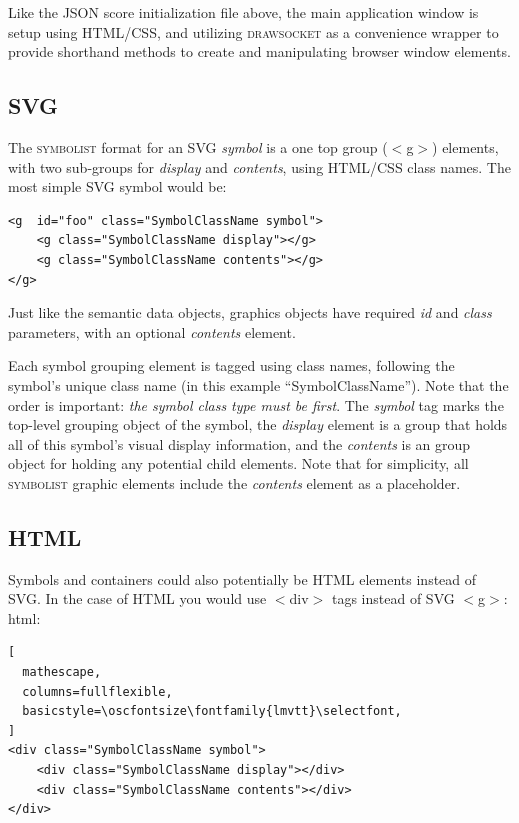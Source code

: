 \documentclass{article}
\def\symbolist{\textsc{symbolist}\xspace}
\def\drawsocket{\textsc{drawsocket}\xspace}
\def\oscfontsize{\footnotesize}
\begin{document}
Like the JSON score initialization file above, the main application window is setup using HTML/CSS, and utilizing \drawsocket as a convenience wrapper to provide shorthand methods to create and manipulating browser window elements. 

\subsection{SVG}

The \symbolist format for an SVG \textit{symbol} is a one top group ($<$g$>$) elements, with two sub-groups for \textit{display} and \textit{contents}, using HTML/CSS class names. The most simple SVG symbol would be:

\begin{lstlisting}[mathescape, columns=fullflexible, breaklines=true,basicstyle=\oscfontsize\fontfamily{lmvtt}\selectfont]
<g  id="foo" class="SymbolClassName symbol">
    <g class="SymbolClassName display"></g>
    <g class="SymbolClassName contents"></g>
</g>
\end{lstlisting}


Just like the semantic data objects, graphics objects have required \textit{id} and \textit{class} parameters, with an optional \textit{contents} element.

Each symbol grouping element is tagged using class names, following the symbol's unique class name (in this example ``SymbolClassName''). Note that the order is important: \textit{the symbol class type must be first}. The \textit{symbol} tag marks the top-level grouping object of the symbol, the \textit{display} element is a group that holds all of this symbol's visual display information, and the \textit{contents} is an group object for holding any potential child elements. Note that for simplicity, all \symbolist graphic elements include the \textit{contents} element as a placeholder.

\subsection{HTML}

Symbols and containers could also potentially be HTML elements instead of SVG. In the case of HTML you would use $<$div$>$ tags instead of SVG $<$g$>$:
html:

\begin{lstlisting}[
  mathescape,
  columns=fullflexible,
  basicstyle=\oscfontsize\fontfamily{lmvtt}\selectfont,
]
<div class="SymbolClassName symbol">
    <div class="SymbolClassName display"></div>
    <div class="SymbolClassName contents"></div>
</div>
\end{lstlisting}
\end{document}
